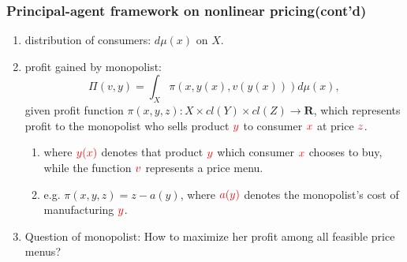 \documentclass[]{beamer}
\theoremstyle{plain}
\theoremstyle{plain} %
\theoremstyle{definition}
\theoremstyle{remark}
\newcommand{\R}{\mathbf{R}}
\begin{document}
\frame
{
	\frametitle{Principal-agent framework on nonlinear pricing(cont'd)}
	\begin{enumerate}[\topsep=0ex]
		\item distribution of consumers: $d\mu (x)$ on $X$.
		\item profit gained  by monopolist: 
		\begin{equation}
			\Pi(v,y)=\int_{X} \pi(x, y(x), v(y(x))) d\mu(x),
		\end{equation}
		given profit function $\pi(x,y,z): X\times cl(Y) \times cl(Z) \longrightarrow \R$, which represents profit to the monopolist who sells product $\color{red} y$ to consumer $\color{red} x$ at price $\color{red} z$. 
		\begin{enumerate}[\topsep=0ex]
			\item where $\color{red} y(x)$ denotes that product $\color{red} y$ which consumer $\color{red} x$ chooses to buy, while the function $\color{red} v$ represents a price menu.
			\item e.g. $\pi(x,y,z) = z - a(y)$, where $\color{red} a(y)$ denotes the monopolist's cost of manufacturing $\color{red} y$.
		\end{enumerate}
		\item Question of monopolist: How to maximize her profit among all {\color{red}feasible price menus}?
	\end{enumerate}
}


%
%
\end{document}
